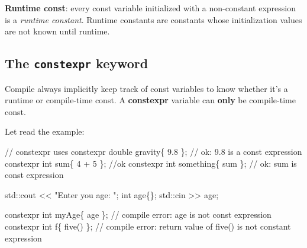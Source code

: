 \documentclass[
  letterpaper,
  DIV=11,
  numbers=noendperiod]{scrreprt}
\newenvironment{Shaded}{\begin{snugshade}}{\end{snugshade}}
\newcommand{\DecValTok}[1]{\textcolor[rgb]{0.68,0.00,0.00}{#1}}
\newcommand{\ErrorTok}[1]{\textcolor[rgb]{0.68,0.00,0.00}{#1}}
\newcommand{\FloatTok}[1]{\textcolor[rgb]{0.68,0.00,0.00}{#1}}
\newcommand{\FunctionTok}[1]{\textcolor[rgb]{0.28,0.35,0.67}{#1}}
\newcommand{\NormalTok}[1]{\textcolor[rgb]{0.00,0.23,0.31}{#1}}
\newcommand{\SpecialCharTok}[1]{\textcolor[rgb]{0.37,0.37,0.37}{#1}}
\newcommand{\StringTok}[1]{\textcolor[rgb]{0.13,0.47,0.30}{#1}}
\begin{document}
\textbf{Runtime const}: every const variable initialized with a
non-constant expression is a \emph{runtime constant}. Runtime constants
are constants whose initialization values are not known until runtime.

\hypertarget{the-constexpr-keyword}{%
\subsection{\texorpdfstring{The \texttt{constexpr}
keyword}{The constexpr keyword}}\label{the-constexpr-keyword}}

Compile always implicitly keep track of const variables to know whether
it's a runtime or compile-time const. A \textbf{constexpr} variable can
\textbf{only} be compile-time const.

Let read the example:

\begin{Shaded}
\begin{Highlighting}[]
\SpecialCharTok{/}\ErrorTok{/}\NormalTok{ constexpr uses}
\NormalTok{    constexpr double gravity\{ }\FloatTok{9.8}\NormalTok{ \};    }\SpecialCharTok{/}\ErrorTok{/}\NormalTok{ ok}\SpecialCharTok{:} \FloatTok{9.8}\NormalTok{ is a const expression}
\NormalTok{    constexpr int sum\{ }\DecValTok{4} \SpecialCharTok{+} \DecValTok{5}\NormalTok{ \};         }\SpecialCharTok{/}\ErrorTok{/}\NormalTok{ok}
\NormalTok{    constexpr int something\{ sum \};     }\SpecialCharTok{/}\ErrorTok{/}\NormalTok{ ok}\SpecialCharTok{:}\NormalTok{ sum is const expression}

\NormalTok{    std}\SpecialCharTok{::}\NormalTok{cout }\SpecialCharTok{\textless{}}\ErrorTok{\textless{}} \StringTok{"Enter you age: "}\NormalTok{;}
\NormalTok{    int age\{\};}
\NormalTok{    std}\SpecialCharTok{::}\NormalTok{cin }\SpecialCharTok{\textgreater{}}\ErrorTok{\textgreater{}}\NormalTok{ age;}

\NormalTok{    constexpr int myAge\{ age \};     }\SpecialCharTok{/}\ErrorTok{/}\NormalTok{ compile error}\SpecialCharTok{:}\NormalTok{ age is not const expression}
\NormalTok{    constexpr int f\{ }\FunctionTok{five}\NormalTok{() \};      }\SpecialCharTok{/}\ErrorTok{/}\NormalTok{ compile error}\SpecialCharTok{:}\NormalTok{ return value of }\FunctionTok{five}\NormalTok{() is not constant expression}
\end{Highlighting}
\end{Shaded}
\end{document}
